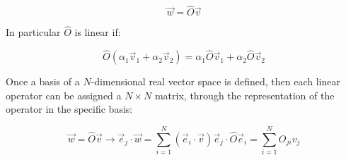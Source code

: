 	$$\vec{w} = \hat{O}\vec{v}$$

	In particular $\hat{O}$ is linear if:

	$$\hat{O}(\alpha_1\vec{v}_1 + \alpha_2\vec{v}_2) = \alpha_1\hat{O}\vec{v}_1 + \alpha_2\hat{O}\vec{v}_2$$

	Once a basis of a $N$-dimensional real vector space is defined, then each linear operator can be assigned a $N\times N$ matrix, through the representation of the operator in the specific basis:

	$$\vec{w} = \hat{O}\vec{v}\rightarrow \vec{e}_j\cdot\vec{w} = \sum\limits_{i=1}^N(\vec{e}_i\cdot\vec{v})\vec{e}_j\cdot\hat{O}\vec{e}_i = \sum\limits_{i=1}^NO_{ji}v_j$$



	
